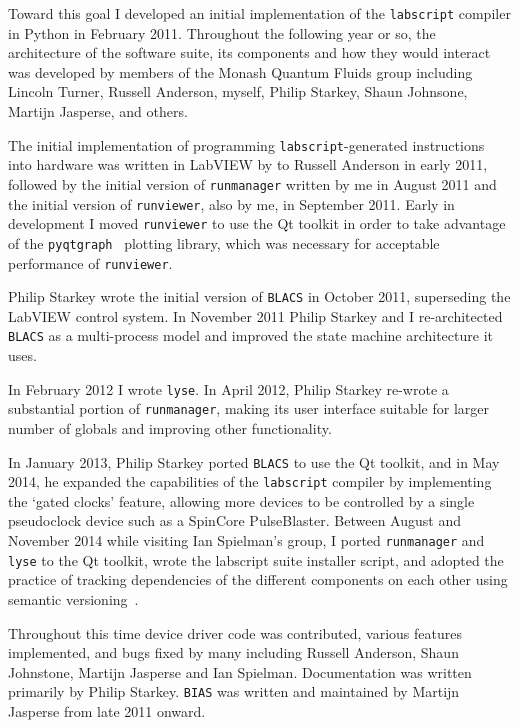 Toward this goal I developed an initial implementation of the \texttt{labscript} compiler in Python in February 2011. Throughout the following year or so, the architecture of the software suite, its components and how they would interact was developed by members of the Monash Quantum Fluids group including Lincoln Turner, Russell Anderson, myself, Philip Starkey, Shaun Johnsone, Martijn Jasperse, and others.

The initial implementation of programming \texttt{labscript}-generated instructions into hardware was written in LabVIEW by to Russell Anderson in early 2011, followed by the initial version of \texttt{runmanager} written by me in August 2011 and the initial version of \texttt{runviewer}, also by me, in September 2011. Early in development I moved \texttt{runviewer} to use the Qt toolkit in order to take advantage of the \texttt{pyqtgraph}~\cite{campagnola_pyqtgraph_2016} plotting library, which was necessary for acceptable performance of \texttt{runviewer}.

Philip Starkey wrote the initial version of \texttt{BLACS} in October 2011, superseding the LabVIEW control system. In November 2011 Philip Starkey and I re-architected \texttt{BLACS} as a multi-process model and improved the state machine architecture it uses.

In February 2012 I wrote \texttt{lyse}. In April 2012, Philip Starkey re-wrote a substantial portion of \texttt{runmanager}, making its user interface suitable for larger number of globals and improving other functionality.

In January 2013, Philip Starkey ported \texttt{BLACS} to use the Qt toolkit, and in May 2014, he expanded the capabilities of the \texttt{labscript} compiler by implementing the `gated clocks' feature, allowing more devices to be controlled by a single pseudoclock device such as a SpinCore PulseBlaster. Between August and November 2014 while visiting Ian Spielman's group, I ported \texttt{runmanager} and \texttt{lyse} to the Qt toolkit, wrote the labscript suite installer script, and adopted the practice of tracking dependencies of the different components on each other using semantic versioning~\cite{tom_preston-werner_semantic_2018}.

Throughout this time device driver code was contributed, various features implemented, and bugs fixed by many including Russell Anderson, Shaun Johnstone, Martijn Jasperse and Ian Spielman. Documentation was written primarily by Philip Starkey. \texttt{BIAS} was written and maintained by Martijn Jasperse from late 2011 onward.

